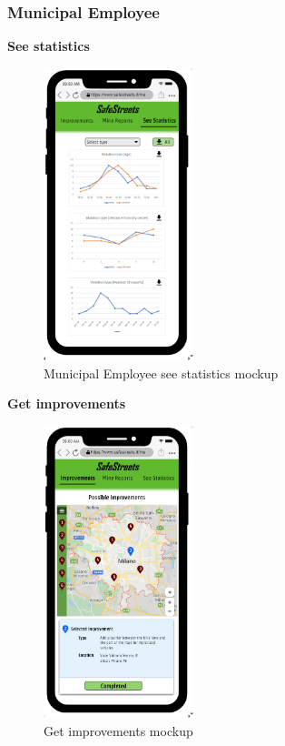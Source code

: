 				\subsubsection{Municipal Employee}
					\begin{center}
						{\small \textbf{See statistics}}
					\end{center}
					\vspace{-5mm}
					\begin{figure}[!h]
						\centering
						\includegraphics[height=8.5cm]{images/MockUp/Authority/MunicipalEmployee/SeeStatistics.png}
						\caption{Municipal Employee see statistics mockup}
					\end{figure}
					\vspace{-1mm}
					\begin{center}
						{\small \textbf{Get improvements}}
					\end{center}
					\vspace{-5mm}
					\begin{figure}[!h]
						\centering
						\includegraphics[height=8.5cm]{images/MockUp/Authority/MunicipalEmployee/Improvements.png}
						\caption{Get improvements mockup}
					\end{figure}
